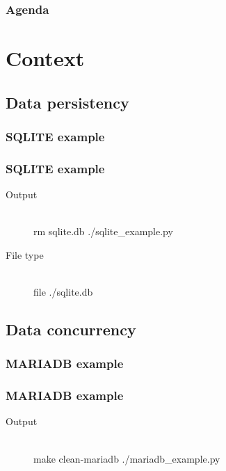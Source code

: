 \documentclass[english]{beamer}
\title{\MYTITLE}
\subtitle{\MYSUBTITLE}
\author[\gitAuthorIsoDate, \REVISIONS, \INSTITUTE]{\ME}
\institute{\INSTITUTE}
\date{\today}
\newcommand{\PROGRAMDIR}{data}
\begin{document}
\maketitle

\begin{frame}
    \frametitle{Agenda}
    \tableofcontents
\end{frame}

\section{Context}
\begin{frame}
    \tableofcontents[current]
\end{frame}

\subsection{Data persistency}
\begin{frame}
    \frametitle{\gls{SQLITE} example}
    \lstset{basicstyle=\tiny\ttfamily,language=Python,numbers=left}
    
\end{frame}
\begin{frame}[containsverbatim]
    \frametitle{\gls{SQLITE} example}
    \begin{description}
    \item[Output] ~\\
\bash[stdout,ignoreExitCode,ignoreStderr,prefix={}]
rm sqlite.db
./sqlite_example.py
\END
    \item[File type] ~\\
\bash[stdout,ignoreExitCode,ignoreStderr,prefix={}]
file ./sqlite.db
\END
    \end{description}
\end{frame}

\subsection{Data concurrency}
\begin{frame}[containsverbatim]
    \frametitle{\gls{MARIADB} example}
    \lstset{basicstyle=\tiny\ttfamily,language=Python,numbers=left}
    
\end{frame}
\begin{frame}[containsverbatim]
    \frametitle{\gls{MARIADB} example}
    \begin{description}
    \item[Output] ~\\
\bash[ignoreExitCode,ignoreStderr,prefix={}]
make clean-mariadb
\END
\bash[stdout,ignoreExitCode,ignoreStderr,prefix={}]
./mariadb_example.py
\END
    \end{description}
\end{frame}
\end{document}
